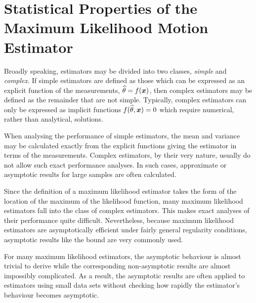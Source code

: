 %
%
%
%
%
%
%

\chapter[Statistical Properties of the ML Motion Estimator]{Statistical
Properties of the Maximum Likelihood Motion Estimator}
\label{sp chp}

\bigletter Broadly speaking, estimators may be divided into two classes,
{\em simple\/} and {\em complex\/}.  If simple estimators are defined as
those which can be expressed as an explicit function of the measurements,
$\widehat{\theta}=f(\bm{x})$, then complex estimators may be defined as the remainder that
are not simple. Typically, complex estimators can only be expressed as
implicit functions $f(\widehat{\theta},\bm{x})=0$ which require numerical, rather than
analytical, solutions.

When analysing the performance of simple estimators, the mean and variance
may be calculated exactly from the explicit functions giving the estimator in
terms of the measurements.  Complex estimators, by their very nature,
usually do not allow such exact performance analyses.  In such cases, 
approximate or asymptotic results for large samples are often calculated.

Since the definition of a maximum likelihood estimator takes the form of
the location of the maximum of the likelihood function, many maximum
likelihood estimators fall into the class of complex estimators.  This
makes exact analyses of their performance quite difficult.  Nevertheless,
because maximum likelihood estimators are asymptotically efficient under
fairly general regularity conditions, asymptotic results like the \CR bound
are very commonly used.

For many maximum likelihood estimators, the asymptotic behaviour is almost
trivial to derive while the corresponding non-asymptotic results are almost
impossibly complicated.  As a result, the asymptotic results are often 
applied to estimators using small data sets without checking how rapidly the
estimator's behaviour becomes asymptotic.


